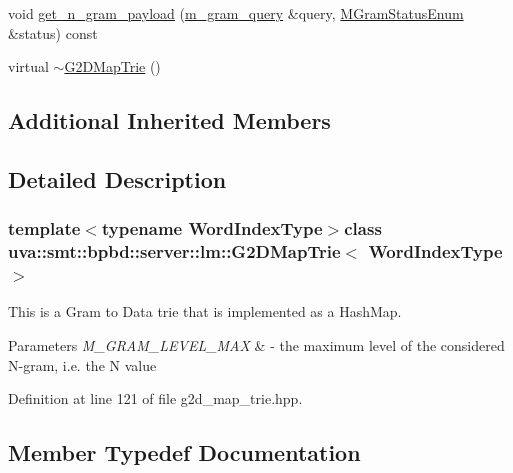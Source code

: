 \begin{DoxyCompactItemize}
\item 
void \hyperlink{classuva_1_1smt_1_1bpbd_1_1server_1_1lm_1_1_g2_d_map_trie_aded631f9f6a8e9cd8a484ecbe54adbfd}{get\+\_\+n\+\_\+gram\+\_\+payload} (\hyperlink{classuva_1_1smt_1_1bpbd_1_1server_1_1lm_1_1m__gram__query}{m\+\_\+gram\+\_\+query} \&query, \hyperlink{namespaceuva_1_1smt_1_1bpbd_1_1server_1_1lm_ab9b3e7382b561dcb8abcd6b55e9b796a}{M\+Gram\+Status\+Enum} \&status) const 
\item 
virtual \hyperlink{classuva_1_1smt_1_1bpbd_1_1server_1_1lm_1_1_g2_d_map_trie_ae52b2fb081b2a00e27f1830789374ece}{$\sim$\+G2\+D\+Map\+Trie} ()
\end{DoxyCompactItemize}
\subsection*{Additional Inherited Members}


\subsection{Detailed Description}
\subsubsection*{template$<$typename Word\+Index\+Type$>$class uva\+::smt\+::bpbd\+::server\+::lm\+::\+G2\+D\+Map\+Trie$<$ Word\+Index\+Type $>$}

This is a Gram to Data trie that is implemented as a Hash\+Map. 
\begin{DoxyParams}{Parameters}
{\em M\+\_\+\+G\+R\+A\+M\+\_\+\+L\+E\+V\+E\+L\+\_\+\+M\+A\+X} & -\/ the maximum level of the considered N-\/gram, i.\+e. the N value \\
\hline
\end{DoxyParams}


Definition at line 121 of file g2d\+\_\+map\+\_\+trie.\+hpp.



\subsection{Member Typedef Documentation}
\hypertarget{classuva_1_1smt_1_1bpbd_1_1server_1_1lm_1_1_g2_d_map_trie_a68a1f3a5cfa63607571c8e7a4261122f}{}
